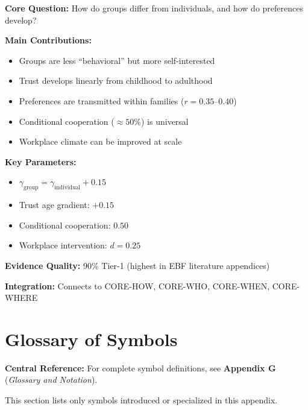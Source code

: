 \begin{tcolorbox}[colback=green!10!white, colframe=green!75!black,
    title=\textbf{Appendix UNMAPPED_SU: Summary}]

\textbf{Core Question:} How do groups differ from individuals, and how do preferences develop?

\textbf{Main Contributions:}
\begin{itemize}[nosep]
    \item Groups are less ``behavioral'' but more self-interested
    \item Trust develops linearly from childhood to adulthood
    \item Preferences are transmitted within families ($r = 0.35$--$0.40$)
    \item Conditional cooperation ($\approx 50\%$) is universal
    \item Workplace climate can be improved at scale
\end{itemize}

\textbf{Key Parameters:}
\begin{itemize}[nosep]
    \item $\gamma_{\text{group}} = \gamma_{\text{individual}} + 0.15$
    \item Trust age gradient: $+0.15$
    \item Conditional cooperation: $0.50$
    \item Workplace intervention: $d = 0.25$
\end{itemize}

\textbf{Evidence Quality:} 90\% Tier-1 (highest in EBF literature appendices)

\textbf{Integration:} Connects to CORE-HOW, CORE-WHO, CORE-WHEN, CORE-WHERE

\end{tcolorbox}


\section{Glossary of Symbols}
\label{sec:su-glossary}

\begin{tcolorbox}[colback=blue!5!white, colframe=blue!75!black]
\textbf{Central Reference:} For complete symbol definitions, see
\textbf{Appendix G} (\textit{Glossary and Notation}).

This section lists only symbols introduced or specialized in this appendix.
\end{tcolorbox}

